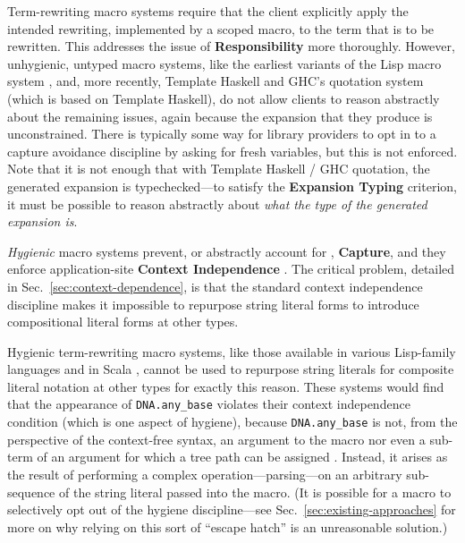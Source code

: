 \documentclass[acmsmall]{acmart}
\newcommand{\li}[1]{\lstinline[basicstyle=\ttfamily\fontsize{9pt}{1em}\selectfont]{#1}}
\begin{document}
Term-rewriting macro systems require that the client explicitly apply the intended rewriting, implemented by a scoped macro, to the term that is to be rewritten. This addresses the issue of \textbf{Responsibility} more thoroughly. However, unhygienic, untyped macro systems, like the earliest variants of the Lisp macro system \cite{Hart63a}, and, more recently, Template Haskell \cite{SheardPeytonJones:Haskell-02} and GHC's quotation system \cite{mainland2007s} (which is based on Template Haskell), do not allow clients to reason abstractly about the remaining issues, again because the expansion that they produce is unconstrained. There is typically some way for library providers to opt in to a capture avoidance discipline by asking for fresh variables, but this is not enforced. Note that it is not enough that with Template Haskell / GHC quotation, the generated expansion is typechecked---to satisfy the \textbf{Expansion Typing} criterion, it must be possible to reason abstractly about \emph{what the type of the generated expansion is}. 

\emph{Hygienic} macro systems prevent, or abstractly account for \cite{DBLP:conf/esop/HermanW08,Herman10:Theory}, \textbf{Capture}, and they enforce application-site \textbf{Context Independence} \cite{Kohlbecker86a,DBLP:conf/popl/Adams15,DBLP:conf/popl/ClingerR91,DBLP:journals/lisp/DybvigHB92}. The critical problem, detailed in Sec.~\ref{sec:context-dependence}, is that the standard context independence discipline makes it impossible to repurpose string literal forms to introduce compositional literal forms at other types. 

Hygienic term-rewriting macro systems, like those available in various Lisp-family languages \cite{mccarthy1978history} and in Scala \cite{ScalaMacros2013}, cannot be used to repurpose string literals for composite literal notation at other types for exactly this reason. These systems would find that the appearance of \li{DNA.any_base}  violates their context independence condition (which is one aspect of {hygiene}), because \li{DNA.any_base} is not, from the perspective of the context-free syntax, an argument to the macro nor even a sub-term of an argument for which a tree path can be assigned \cite{DBLP:conf/esop/HermanW08,Herman10:Theory,gorn1965explicit}. Instead, it arises as the result of performing a complex operation---parsing---on an arbitrary sub-sequence of the string literal passed into the macro. (It is  possible for a macro to selectively opt out of the hygiene discipline---see Sec.~\ref{sec:existing-approaches} for more on why relying on this sort of ``escape hatch'' is an unreasonable solution.) %
\end{document}
